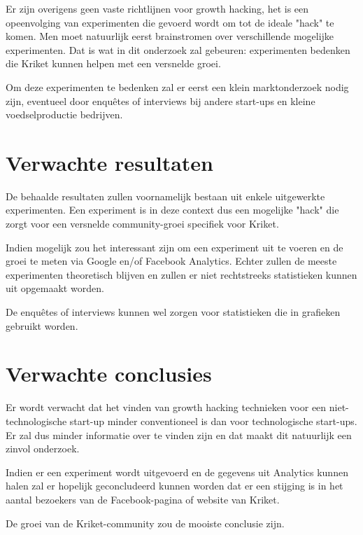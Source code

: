 Er zijn overigens geen vaste richtlijnen voor growth hacking, het is een opeenvolging van experimenten die gevoerd wordt om tot de ideale "hack" te komen. Men moet natuurlijk eerst brainstromen over verschillende mogelijke experimenten. Dat is wat in dit onderzoek zal gebeuren: experimenten bedenken die Kriket kunnen helpen met een versnelde groei.

Om deze experimenten te bedenken zal er eerst een klein marktonderzoek nodig zijn, eventueel door enquêtes of interviews bij andere start-ups en kleine voedselproductie bedrijven. 


\section{Verwachte resultaten}
\label{sec:verwachte_resultaten}

De behaalde resultaten zullen voornamelijk bestaan uit enkele uitgewerkte experimenten. Een experiment is in deze context dus een mogelijke "hack" die zorgt voor een versnelde community-groei specifiek voor Kriket. 

Indien mogelijk zou het interessant zijn om een experiment uit te voeren en de groei te meten via Google en/of Facebook Analytics. Echter zullen de meeste experimenten theoretisch blijven en zullen er niet rechtstreeks statistieken kunnen uit opgemaakt worden.

De enquêtes of interviews kunnen wel zorgen voor statistieken die in grafieken gebruikt worden.

\section{Verwachte conclusies}
\label{sec:verwachte_conclusies}

Er wordt verwacht dat het vinden van growth hacking technieken voor een niet-technologische start-up minder conventioneel is dan voor technologische start-ups. Er zal dus minder informatie over te vinden zijn en dat maakt dit natuurlijk een zinvol onderzoek.

Indien er een experiment wordt uitgevoerd en de gegevens uit Analytics kunnen halen zal er hopelijk geconcludeerd kunnen worden dat er een stijging is in het aantal bezoekers van de Facebook-pagina of website van Kriket.

De groei van de Kriket-community zou de mooiste conclusie zijn.

